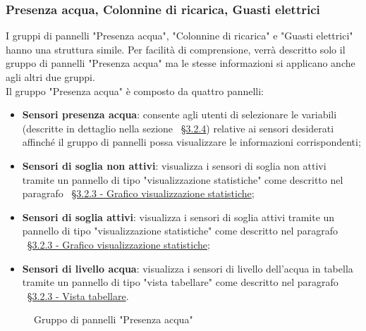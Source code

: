 \subsubsection{Presenza acqua, Colonnine di ricarica, Guasti elettrici}
I gruppi di pannelli "Presenza acqua", "Colonnine di ricarica" e "Guasti elettrici" hanno una struttura simile. Per facilità di comprensione, verrà descritto solo il gruppo di pannelli "Presenza acqua" ma le stesse informazioni si applicano anche agli altri due gruppi. \\
Il gruppo "Presenza acqua" è composto da quattro pannelli:
\begin{itemize}
    \item \textbf{Sensori presenza acqua}: consente agli utenti di selezionare le variabili (descritte in dettaglio nella sezione ~\hyperlink{par:gestione_variabili_panel}{\S3.2.4}) relative ai sensori desiderati affinché il gruppo di pannelli possa visualizzare le informazioni corrispondenti;
    \item \textbf{Sensori di soglia non attivi}: visualizza i sensori di soglia non attivi tramite un pannello di tipo "visualizzazione statistiche" come descritto nel paragrafo ~\hyperlink{par:visu_stat}{\S 3.2.3 - Grafico visualizzazione statistiche};
    \item \textbf{Sensori di soglia attivi}: visualizza i sensori di soglia attivi tramite un pannello di tipo "visualizzazione statistiche" come descritto nel paragrafo ~\hyperlink{par:visu_stat}{\S 3.2.3 - Grafico visualizzazione statistiche};
    \item \textbf{Sensori di livello acqua}: visualizza i sensori di livello dell'acqua in tabella tramite un pannello di tipo "vista tabellare" come descritto nel paragrafo ~\hyperlink{par:tabella}{\S3.2.3 - Vista tabellare}.
\end{itemize}
\begin{figure}[H]
    \centering
    \caption{Gruppo di pannelli "Presenza acqua"}
    \label{fig:my_label}
\end{figure}

